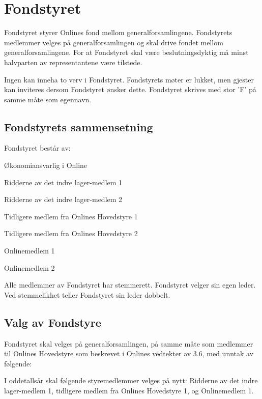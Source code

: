 \chapter{Fondstyret}
\vspace{23pt}

Fondstyret styrer Onlines fond mellom generalforsamlingene. Fondstyrets medlemmer velges på generalforsamlingen og skal drive fondet mellom generalforsamlingene. For at Fondstyret skal være beslutningsdyktig må minst halvparten av representantene være tilstede.

Ingen kan inneha to verv i Fondstyret. Fondstyrets møter er lukket, men gjester kan inviteres dersom Fondstyret ønsker dette. Fondstyret skrives med stor ’F’ på samme måte som egennavn.

\section{Fondstyrets sammensetning}


Fondstyret består av:

\begin{liste}
  \item Økonomiansvarlig i Online
  \item Ridderne av det indre lager-medlem 1
  \item Ridderne av det indre lager-medlem 2
  \item Tidligere medlem fra Onlines Hovedstyre 1
  \item Tidligere medlem fra Onlines Hovedstyre 2
  \item Onlinemedlem 1
  \item Onlinemedlem 2
\end{liste}

Alle medlemmer av Fondstyret har stemmerett. Fondstyret velger sin egen leder. Ved stemmelikhet teller Fondstyret sin leder dobbelt.

\section{Valg av Fondstyre}


Fondstyret skal velges på generalforsamlingen, på samme måte som medlemmer til Onlines Hovedstyre som beskrevet i Onlines vedtekter av 3.6, med unntak av følgende:

I oddetallsår skal følgende styremedlemmer velges på nytt: Ridderne av det indre lager-medlem 1, tidligere medlem fra Onlines Hovedstyre 1, og Onlinemedlem 1.

